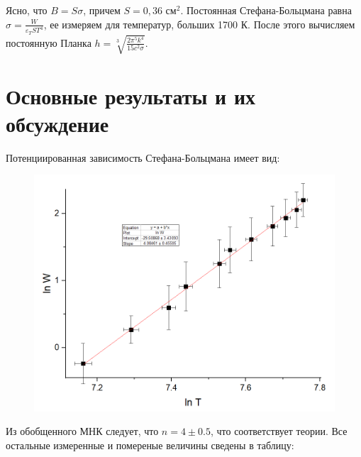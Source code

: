 \documentclass[%
 reprint,
 amsmath,amssymb,
 aps,
]{revtex4-2}
\begin{document}
Ясно, что $B = S\sigma$, причем $S = 0,36 \text{ см}^2$. Постоянная Стефана-Больцмана равна $\sigma = \frac{W}{\varepsilon_T S T^4}$, ее измеряем для температур, больших 1700 К. После этого вычисляем постоянную Планка $h = \sqrt[3]{\frac{2\pi^5k^4}{15c^2\sigma}}$.

\section{Основные результаты и их обсуждение}

Потенциированная зависимость Стефана-Больцмана имеет вид:
\begin{figure}[h]
	\includegraphics[scale=0.8]{1.png}
\end{figure}

Из обобщенного МНК следует, что $n = 4 \pm 0.5$, что соответствует теории. Все остальные измеренные и помереные величины сведены в таблицу:
\end{document}
